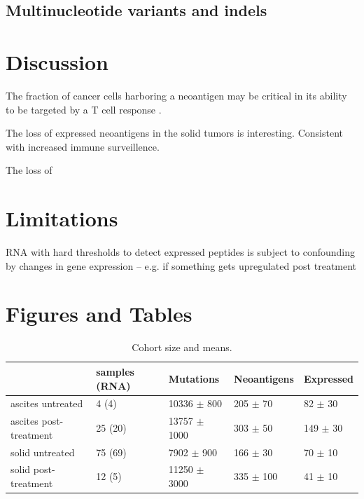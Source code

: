 \subsection*{Multinucleotide variants and indels}


\section*{Discussion}

The fraction of cancer cells harboring a neoantigen may be critical in its ability to be targeted by a T cell response \cite{McGranahan_2016}.

The loss of expressed neoantigens in the solid tumors is interesting. Consistent with increased immune surveillence.

The loss of 

\section*{Limitations}
RNA with hard thresholds to detect expressed peptides is subject to confounding by changes in gene expression -- e.g. if something gets upregulated post treatment

\section*{Figures and Tables}

\begin{table}

\begin{tabular}{lllll}
\toprule
{} & samples (RNA) &         Mutations &    Neoantigens &     Expressed \\
\midrule
ascites untreated      &         4 (4) &   10336 $\pm$ 800 &   205 $\pm$ 70 &   82 $\pm$ 30 \\
ascites post-treatment &       25 (20) &  13757 $\pm$ 1000 &   303 $\pm$ 50 &  149 $\pm$ 30 \\
solid untreated        &       75 (69) &    7902 $\pm$ 900 &   166 $\pm$ 30 &   70 $\pm$ 10 \\
solid post-treatment   &        12 (5) &  11250 $\pm$ 3000 &  335 $\pm$ 100 &   41 $\pm$ 10 \\
\bottomrule
\end{tabular}


\caption{Cohort size and means.}
\label{tab:cohort}
\end{table}

